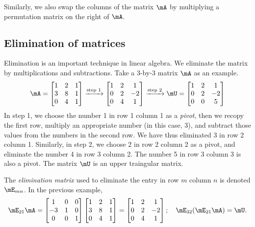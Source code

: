\documentclass[11pt]{article}
\theoremstyle{plain}
\theoremstyle{definition}
\begin{document}
\vspace{.2cm}
Similarly, we also swap the columns of the matrix $\mA$ by multiplying a permutation matrix on the right of $\mA$.

\subsection{Elimination of matrices}
Elimination is an important technique in linear algebra. We eliminate the matrix by multiplications and subtractions. Take a 3-by-3 matrix $\mA$ as an example.
\begin{align}
	\mA = \begin{bmatrix}
		1 &2&1\\3 & 8 & 1\\ 0 & 4 & 1 
	\end{bmatrix}
	\xrightarrow{\text{step 1}} \begin{bmatrix}
		1 &2&1\\0 & 2 & -2\\ 0 & 4 & 1 
	\end{bmatrix}
	\xrightarrow{\text{step 2}} \mU =  \begin{bmatrix}
		1 &2&1\\0 & 2 & -2\\ 0 & 0 & 5
	\end{bmatrix}
\end{align}
In step 1, we choose the number 1 in row 1 column 1 as a \textit{pivot}, then we recopy the first row, multiply an appropriate number (in this case, 3), and subtract those values from the numbers in the second row. We have thus eliminated 3 in row 2 column 1. Similarly, in step 2, we choose 2 in row 2 column 2 as a pivot, and eliminate the number 4 in row 3 column 2.  The number 5 in row 3 column 3 is also a pivot. The matrix $\mU$ is an upper traingular matrix.

\vspace{.2cm}
The \textit{elimination matrix} used to eliminate the entry in row $m$ column $n$ is denoted $\mE_{mn}$. In the previous example, 
\begin{align}
\mE_{21} \mA = 
\begin{bmatrix}
		1 &0&0\\-3 & 1 & 0\\ 0 & 0 & 1 
	\end{bmatrix}
	\begin{bmatrix}
		1 &2&1\\3 & 8 & 1\\ 0 & 4 & 1 
	\end{bmatrix} = \begin{bmatrix}
		1 &2&1\\0 & 2 & -2\\ 0 & 4 & 1 
	\end{bmatrix};\quad \mE_{32} (\mE_{21} \mA) = \mU.
\end{align}
\end{document}
